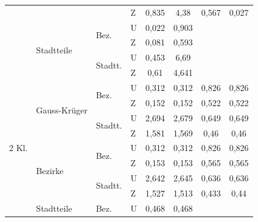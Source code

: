 \documentclass{Vorlage}
\begin{document}
\begin{table}[h]
\begin{tabular}{llll|cc|cc}
                        &                               &                          & Z & 0,835       & 4,38       & 0,567             & 0,027           \\ \cline{2-8} 
                        & \multirow{4}{*}{Stadtteile}   & \multirow{2}{*}{Bez.}    & U & 0,022       & 0,903      &                   &                 \\
                        &                               &                          & Z & 0,081       & 0,593      &                   &                 \\ \cline{3-8} 
                        &                               & \multirow{2}{*}{Stadtt.} & U & 0,453       & 6,69       &                   &                 \\
                        &                               &                          & Z & 0,61        & 4,641       &                   &                 \\ \hline
\multirow{12}{*}{2 Kl.}  & \multirow{4}{*}{Gauss-Krüger} & \multirow{2}{*}{Bez.}   & U & 0,312      & 0,312      &     0,826           &  0,826
 \\
                        &                               &                          & Z & 0,152      & 0,152      &   0,522           &  0,522     \\ \cline{3-8} 
                        &                               & \multirow{2}{*}{Stadtt.} & U & 2,694       & 2,679     &   0,649          &  0,649   \\
                        &                               &                          & Z & 1,581       & 1,569      &  0,46            &   0,46   \\ \cline{2-8} 
                        & \multirow{4}{*}{Bezirke}      & \multirow{2}{*}{Bez.}    & U & 0,312       & 0,312      &  0,826            &   0,826    \\
                        &                               &                          & Z & 0,153       & 0,153      &  0,565            &  0,565    \\ \cline{3-8} 
                        &                               & \multirow{2}{*}{Stadtt.} & U & 2,642       & 2,645      &  0,636           &   0,636    \\
                        &                               &                          & Z & 1,527       & 1,513    &  0,433            &    0,44   
\\ \cline{2-8} 
                        & \multirow{4}{*}{Stadtteile}   & \multirow{2}{*}{Bez.}    & U & 0,468       & 0,468      &                   &                 \\

\end{tabular}
\end{table}
\end{document}
